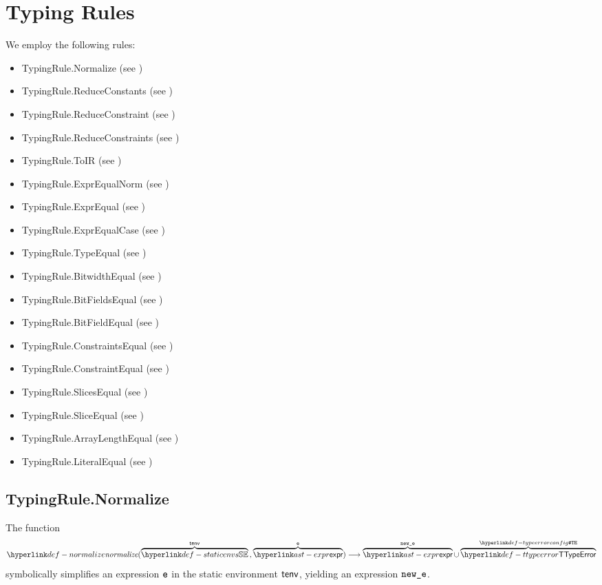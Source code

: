 \section{Typing Rules\label{sec:SymbolicReductionAndEquivalenceTestingRules}}
We employ the following rules:
\begin{itemize}
  \item TypingRule.Normalize (see )
  \item TypingRule.ReduceConstants (see )
  \item TypingRule.ReduceConstraint (see )
  \item TypingRule.ReduceConstraints (see )
  \item TypingRule.ToIR (see )
  \item TypingRule.ExprEqualNorm (see )
  \item TypingRule.ExprEqual (see )
  \item TypingRule.ExprEqualCase (see )
  \item TypingRule.TypeEqual (see )
  \item TypingRule.BitwidthEqual (see )
  \item TypingRule.BitFieldsEqual (see )
  \item TypingRule.BitFieldEqual (see )
  \item TypingRule.ConstraintsEqual (see )
  \item TypingRule.ConstraintEqual (see )
  \item TypingRule.SlicesEqual (see )
  \item TypingRule.SliceEqual (see )
  \item TypingRule.ArrayLengthEqual (see )
  \item TypingRule.LiteralEqual (see )
\end{itemize}

\subsection{TypingRule.Normalize \label{sec:TypingRule.Normalize}}
\hypertarget{def-normalize}{}
The function
\[
\normalize(\overname{\staticenvs}{\tenv} \aslsep \overname{\expr}{\ve}) \aslto \overname{\expr}{\newe} \cup \overname{\TTypeError}{\TypeErrorConfig}
\]
\hypertarget{def-symbolicallysimplifies}{symbolically simplifies} an expression $\texttt{e}$ in the static environment $\textsf{tenv}$,
yielding an expression $\texttt{new\_e}$.
\ProseOtherwiseTypeError

